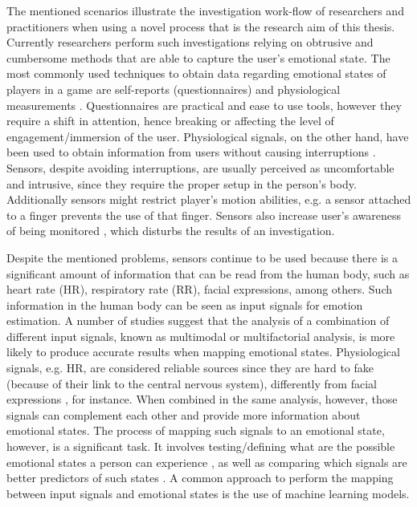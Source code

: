 The mentioned scenarios illustrate the investigation work-flow of researchers and practitioners when using a novel process that is the research aim of this thesis. Currently researchers perform such investigations relying on obtrusive and cumbersome methods that are able to capture the user's emotional state. The most commonly used techniques to obtain data regarding emotional states of players in a game are self-reports (questionnaires) and physiological measurements \parencite{mekler2014systematic}. Questionnaires are practical and ease to use tools, however they require a shift in attention, hence breaking or affecting the level of engagement/immersion of the user. Physiological signals, on the other hand, have been used to obtain information from users without causing interruptions \parencite{bousefsaf2013remote,yun2009game,rani2006empirical,tijs2008dynamic}. Sensors, despite avoiding interruptions, are usually perceived as uncomfortable and intrusive, since they require the proper setup in the person's body. Additionally sensors might restrict player's motion abilities, e.g. a sensor attached to a finger prevents the use of that finger. Sensors also increase user's awareness of being monitored \parencite{yamakoshi2007preliminary,yamaguchi2006evaluation,healey2005detecting}, which disturbs the results of an investigation.


Despite the mentioned problems, sensors continue to be used because there is a significant amount of information that can be read from the human body, such as heart rate (HR), respiratory rate (RR), facial expressions, among others. Such information in the human body can be seen as input signals for emotion estimation. A number of studies \parencite{kukolja2014comparative} suggest that the analysis of a combination of different input signals, known as multimodal or multifactorial analysis, is more likely to produce accurate results when mapping emotional states. Physiological signals, e.g. HR, are considered reliable sources since they are hard to fake (because of their link to the central nervous system), differently from facial expressions \parencite{Landowska}, for instance. When combined in the same analysis, however, those signals can complement each other and provide more information about emotional states. The process of mapping such signals to an emotional state, however, is a significant task. It involves testing/defining what are the possible emotional states a person can experience \parencite{mandryk2006continuous}, as well as comparing which signals are better predictors of such states \parencite{jerritta2011physiological}. A common approach to perform the mapping between input signals and emotional states is the use of machine learning models.

